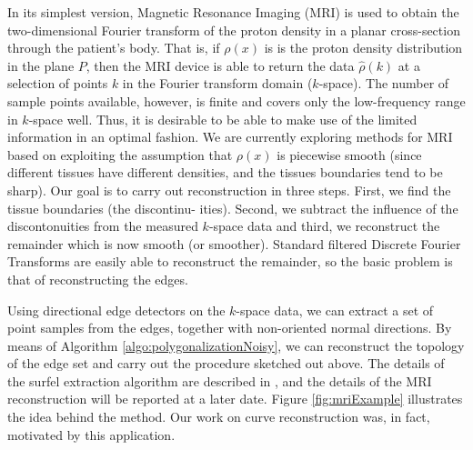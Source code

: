 \documentclass{article}
\numberwithin{cntr}{section}
\numberwithin{equation}{section}
\begin{document}
In its simplest version, Magnetic Resonance Imaging (MRI) is
used to obtain the
two-dimensional Fourier transform of the proton density in a
planar cross-section through the patient's body.
That is, if $\rho(x)$ is
is the proton density distribution in the plane $P$, then the MRI device
is able to return the data $\hat{\rho}(k)$ at a selection of
points $k$ in the Fourier transform domain ($k$-space).
The number of sample points available, however, is finite and covers
only the low-frequency range in $k$-space well.
Thus, it is desirable to be able to make use of the limited
information in an optimal fashion.
We are currently exploring methods for MRI based on
exploiting the assumption that
$\rho(x)$ is piecewise smooth (since different tissues have different
densities, and the tissues boundaries tend to be sharp).
Our goal is to carry out reconstruction in three steps.
First, we find the tissue boundaries (the discontinu-
ities). Second, we subtract the influence of the discontonuities from
the measured $k$-space data and third, we reconstruct the remainder which
is now smooth (or smoother). Standard filtered Discrete Fourier Transforms
are easily able to reconstruct the remainder, so the basic
problem is that of reconstructing the edges.

Using directional edge detectors on the $k$-space data, we can extract
a set of point samples from the edges, together with non-oriented normal 
directions.  By means of
Algorithm \ref{algo:polygonalizationNoisy}, we can 
reconstruct the topology of the edge set and carry out the 
procedure sketched out above.
The details of the surfel extraction algorithm are described in \cite{WAVEFRONT}, and the details of the MRI reconstruction will be reported at a later date. Figure \ref{fig:mriExample} illustrates the idea behind the method. Our work on curve reconstruction was, in fact, motivated by this application.
\end{document}
